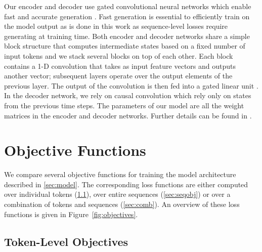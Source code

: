 \documentclass[11pt,a4paper]{article}
\begin{document}
Our encoder and decoder use gated convolutional neural networks which enable fast and accurate generation \cite{gehring2017icml}. Fast generation is essential to efficiently train on the model output as is done in this work as sequence-level losses require generating at training time.
Both encoder and decoder networks share a simple block structure that computes intermediate states based on a fixed number of input tokens and we stack several blocks on top of each other.
Each block contains a 1-D convolution that takes as input  feature vectors and outputs another vector; subsequent layers operate over the  output elements of the previous layer. The output of the convolution is then fed into a gated linear unit \citep{dauphin2017icml}.
In the decoder network, we rely on causal convolution which rely only on states from the previous time steps. The parameters  of our model are all the weight matrices in the encoder and decoder networks. Further details can be found in \citet{gehring2017icml}.

\section{Objective Functions}
\label{sec:objectives}

We compare several objective functions for training the model architecture described in \textsection\ref{sec:model}. The corresponding loss functions are either computed over individual tokens (\textsection\ref{sec:tokobj}), over entire sequences (\textsection\ref{sec:seqobj}) or over a combination of tokens and sequences (\textsection\ref{sec:comb}). An overview of these loss functions is given in Figure~\ref{fig:objectives}.


\begin{figure*}

\caption{Token and sequence negative log-likelihood (Equations~\ref{eq:toknll} and~\ref{eq:seqnll}), token-level label smoothing (Equation~\ref{eq:tokls}), expected risk (Equation~\ref{eq:risk}), max-margin (Equation~\ref{eq:maxmargin}), multi-margin (Equation~\ref{eq:multimargin}), softmax-margin (Equation~\ref{eq:smm}).
We denote the source as , the reference target as , the set of candidate outputs as  and the best candidate (pseudo reference) as .
For max-margin we denote the candidate with the highest model score as .
\label{fig:objectives}}
\end{figure*}

\subsection{Token-Level Objectives}
\label{sec:tokobj}
\end{document}

